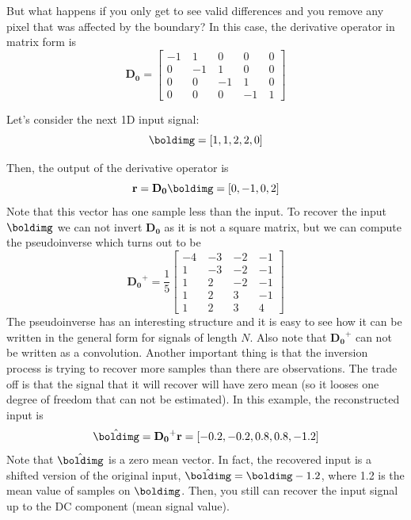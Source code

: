 But what happens if you only get to see valid differences and you remove any pixel that was affected by the boundary? In this case, the derivative operator in matrix form is
\begin{equation}
\mathbf{D_0} = 
\begin{bmatrix}
  -1 ~& 1 ~& 0 ~& 0~& 0 \\
  0 ~& -1 ~& 1 ~& 0 ~& 0\\
  0~& 0 ~& -1 ~& 1 ~& 0\\
  0~& 0 ~& 0 ~& -1 ~& 1
\end{bmatrix}
\end{equation}

Let's consider the next 1D input signal:
\begin{equation}
\boldimg = \left[1, 1, 2, 2, 0\right]
\end{equation}

Then, the output of the derivative operator is
\begin{equation}
\mathbf{r}=\mathbf{D_0} \boldimg=\left[0, -1, 0, 2\right]
\end{equation}
Note that this vector has one sample less than the input. To recover the input $\boldimg$ we can not invert $\mathbf{D_0}$ as it is not a square matrix, but we can compute the pseudoinverse which turns out to be
\begin{equation}
\mathbf{D_0}^{+} = \frac{1}{5}
\begin{bmatrix}
  -4 ~& -3 ~& -2~& -1 \\
  1 ~& -3 ~& -2 ~&-1 \\
  1~& 2 ~& -2 ~& -1\\
  1~& 2 ~& 3 ~& -1\\
  1~& 2 ~& 3 ~& 4
 \end{bmatrix}
\end{equation}
The pseudoinverse has an interesting structure and it is easy to see how it can be written in the general form for signals of length $N$. Also note that $\mathbf{D_0}^{+}$ can not be written as a convolution. 
Another important thing is that the inversion process is trying to recover more samples than there are observations. The trade off is that the signal that it will recover will have zero mean (so it looses one degree of freedom that can not be estimated). In this example, the reconstructed input is
\begin{equation}
\hat{\boldimg} = \mathbf{D_0}^{+} \mathbf{r} =
\left[-0.2, -0.2, 0.8, 0.8, -1.2 \right]
\end{equation}
Note that $\hat{\boldimg}$ is a zero mean vector. In fact, the recovered input is a shifted version of the original input, $\hat{\boldimg} = \boldimg - 1.2$, where 1.2 is the mean value of samples on $\boldimg$.
Then, you still can recover the input signal up to the DC component (mean signal value). 


